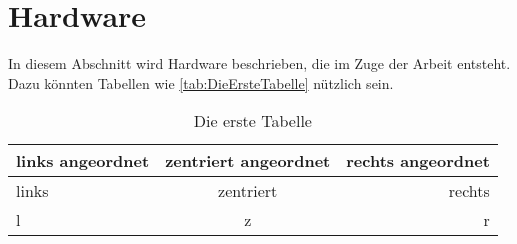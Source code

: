 

\section{Hardware} \label{sec:Hardware}

In diesem Abschnitt wird Hardware beschrieben, die im Zuge der Arbeit entsteht. Dazu könnten Tabellen wie \autoref{tab:DieErsteTabelle} nützlich sein.
		
		
\begin{table}[htbp]
	\centering																	%
	\caption{Die erste Tabelle}													%
	\label{tab:DieErsteTabelle}													%
	\begin{tabular}{l|c|r}														%
		links angeordnet	& zentriert angeordnet	& rechts angeordnet \\ 		%
		\hline 																	%
		links 				& zentriert 			& rechts \\					%
		l 					& z			 			& r \\					%
		
	\end{tabular}
\end{table}